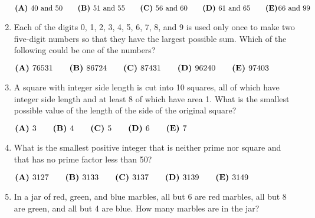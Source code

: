 \documentclass{article}
\begin{document}
\begin{enumerate}[label=\arabic*., itemsep=0.5em]
\( \textbf{(A)}\hspace{.05in}40\text{ and }50\qquad\textbf{(B)}\hspace{.05in}51\text{ and }55\qquad\textbf{(C)}\hspace{.05in}56\text{ and }60\qquad\textbf{(D)}\hspace{.05in}\text{61 and 65}\qquad\textbf{(E)}\hspace{.01in}\text{66 and 99} \)\par \vspace{0.5em}\item Each of the digits 0, 1, 2, 3, 4, 5, 6, 7, 8, and 9 is used only once to make two five-digit numbers so that they have the largest possible sum. Which of the following could be one of the numbers?

\( \textbf{(A)}\hspace{.05in}76531\qquad\textbf{(B)}\hspace{.05in}86724\qquad\textbf{(C)}\hspace{.05in}87431\qquad\textbf{(D)}\hspace{.05in}96240\qquad\textbf{(E)}\hspace{.05in}97403 \)\par \vspace{0.5em}\item A square with integer side length is cut into 10 squares, all of which have integer side length and at least 8 of which have area 1. What is the smallest possible value of the length of the side of the original square?

\( \textbf{(A)}\hspace{.05in}3\qquad\textbf{(B)}\hspace{.05in}4\qquad\textbf{(C)}\hspace{.05in}5\qquad\textbf{(D)}\hspace{.05in}6\qquad\textbf{(E)}\hspace{.05in}7 \)\par \vspace{0.5em}\item What is the smallest positive integer that is neither prime nor square and that has no prime factor less than 50?

\( \textbf{(A)}\hspace{.05in}3127\qquad\textbf{(B)}\hspace{.05in}3133\qquad\textbf{(C)}\hspace{.05in}3137\qquad\textbf{(D)}\hspace{.05in}3139\qquad\textbf{(E)}\hspace{.05in}3149 \)\par \vspace{0.5em}\item In a jar of red, green, and blue marbles, all but 6 are red marbles, all but 8 are green, and all but 4 are blue. How many marbles are in the jar?


\end{enumerate}
\end{document}
